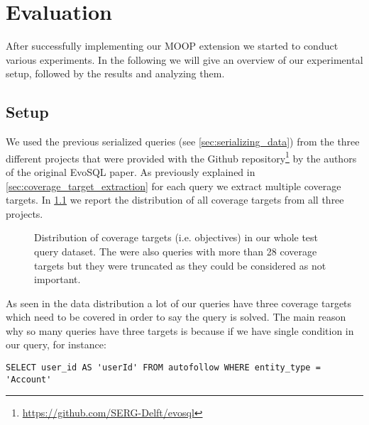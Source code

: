 \chapter{Evaluation}
\label{cha:evaluation}

After successfully implementing our MOOP extension we started to conduct various experiments. In the following we will give an overview of our experimental setup, followed by the results and analyzing them.

\section{Setup}
\label{sec:experimental_setup}
We used the previous serialized queries (see \cref{sec:serializing_data}) from the three different projects that were provided with the Github repository\footnote{\href{https://github.com/SERG-Delft/evosql}{https://github.com/SERG-Delft/evosql}} by the authors of the original EvoSQL paper. As previously explained in \cref{sec:coverage_target_extraction} for each query we extract multiple coverage targets. In \cref{fig:cov_targets_dist} we report the distribution of all coverage targets from all three projects.

\begin{figure}
	\centering
	\caption{Distribution of coverage targets (i.e. objectives) in our whole test query dataset. The were also queries with more than 28 coverage targets but they were truncated as they could be considered as not important.}
	\label{fig:cov_targets_dist}
\end{figure}

As seen in the data distribution a lot of our queries have three coverage targets which need to be covered in order to say the query is solved. The main reason why so many queries have three targets is because if we have single condition in our query, for instance:
\begin{verbatim}
SELECT user_id AS 'userId' FROM autofollow WHERE entity_type = 'Account'
\end{verbatim}

